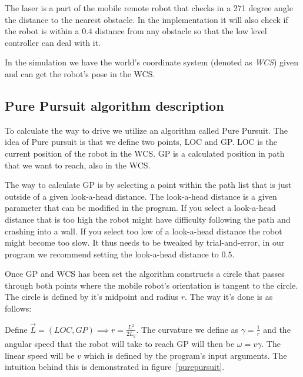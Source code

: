 \documentclass[12pt]{article}
\begin{document}
The laser is a part of the mobile remote robot that checks in a 271 degree angle
the distance to the nearest obstacle. In the implementation it will also check
if the robot is within a $0.4$ distance from any obstacle so that the low level
controller can deal with it.

In the simulation we have the world's coordinate system (denoted as
\textit{WCS}) given and can get the robot's pose in the WCS. 

\subsection{Pure Pursuit algorithm description}

To calculate the way to drive we utilize an algorithm called Pure Pursuit. The
idea of Pure pursuit is that we define two points, LOC and GP. LOC is the
current position of the robot in the WCS. GP is a calculated position in path
that we want to reach, also in the WCS. 

The way to calculate GP is by selecting a point within the path list that is
just outside of a given look-a-head distance. The look-a-head distance is a
given parameter that can be modified in the program. If you select a look-a-head
distance that is too high the robot might have difficulty following the path and
crashing into a wall. If you select too low of a look-a-head distance the robot
might become too slow. It thus needs to be tweaked by trial-and-error, in our
program we recommend setting the look-a-head distance to $0.5$.

Once GP and WCS has been set the algorithm constructs a circle that passes
through both points where the mobile robot's orientation is tangent to the
circle. The circle is defined by it's midpoint and radius $r$. The way it's done is
as follows:

Define $\vec{L} = (LOC, GP) \implies r = \frac{L^2}{2L_{y}}$. The curvature we
define as $\gamma = \frac{1}{r}$ and the angular speed that the robot will
take to reach GP will then be $\omega = v\gamma$. The linear speed will 
be $v$ which is defined by the program's input arguments. The intuition behind
this is demonstrated in figure~\ref{purepursuit}.







\end{document}
